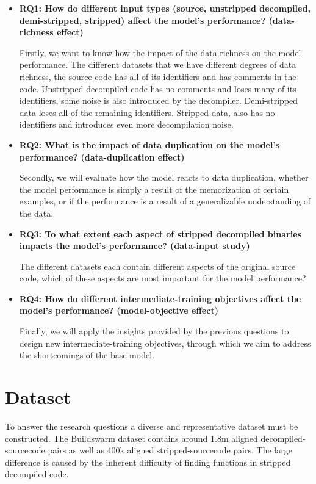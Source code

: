 \begin{itemize}
    \item \textbf{RQ1: How do different input types (source, unstripped decompiled, demi-stripped, stripped) affect the model's performance? (data-richness effect)}
    \begin{sloppypar}
    Firstly, we want to know how the impact of the data-richness on the model performance. The different datasets that we have different degrees of data richness, the source code has all of its identifiers and has comments in the code. Unstripped decompiled code has no comments and loses many of its identifiers, some noise is also introduced by the decompiler. Demi-stripped data loses all of the remaining identifiers. Stripped data, also has no identifiers and introduces even more decompilation noise.
    \end{sloppypar}
    \item \textbf{RQ2: What is the impact of data duplication on the model's performance? (data-duplication effect)}
    \begin{sloppypar}
    Secondly, we will evaluate how the model reacts to data duplication, whether the model performance is simply a result of the memorization of certain examples, or if the performance is a result of a generalizable understanding of the data.
    \end{sloppypar}
    \item \textbf{RQ3: To what extent each aspect of stripped decompiled binaries impacts the model's performance? (data-input study)}
    \begin{sloppypar}
    The different datasets each contain different aspects of the original source code, which of these aspects are most important for the model performance? 
    \end{sloppypar}
    \item \textbf{RQ4: How do different intermediate-training objectives affect the model's performance? (model-objective effect)}
    \begin{sloppypar}
    Finally, we will apply the insights provided by the previous questions to design new intermediate-training objectives, through which we aim to address the shortcomings of the base model. 
    \end{sloppypar}
\end{itemize}

\section{Dataset}
To answer the research questions a diverse and representative dataset must be constructed. The Buildswarm dataset contains around 1.8m aligned decompiled-sourcecode pairs as well as 400k aligned stripped-sourcecode pairs. The large difference is caused by the inherent difficulty of finding functions in stripped decompiled code. 

